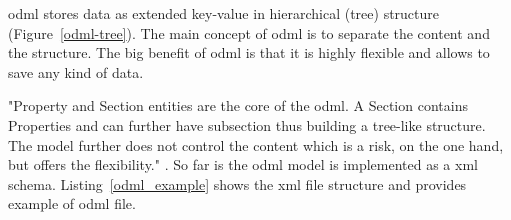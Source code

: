 \gls{odml} stores data as extended key-value in hierarchical (tree) structure (Figure~\ref{odml-tree}). The main concept of \gls{odml} is to separate the content and the structure. The big benefit of \gls{odml} is that it is highly flexible and allows to save any kind of data.

"Property and Section entities are the core of the odml. A Section contains Properties and can further have subsection thus building a tree-like structure. The model further does not control the content which is a risk, on the one hand, but offers the flexibility." \cite{odml}. So far is the \gls{odml} model is implemented as a \gls{xml} schema. Listing~\ref{odml_example} shows the \gls{xml} file structure and provides example of \gls{odml} file.

